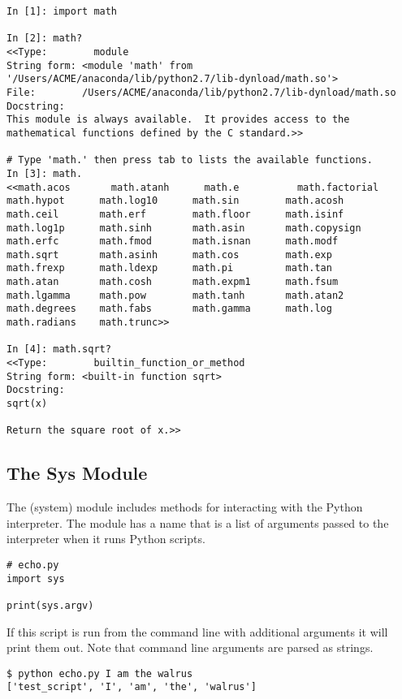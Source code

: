 \begin{lstlisting}
In [1]: import math

In [2]: math?
<<Type:        module
String form: <module 'math' from '/Users/ACME/anaconda/lib/python2.7/lib-dynload/math.so'>
File:        /Users/ACME/anaconda/lib/python2.7/lib-dynload/math.so
Docstring:
This module is always available.  It provides access to the
mathematical functions defined by the C standard.>>

# Type 'math.' then press tab to lists the available functions.
In [3]: math.
<<math.acos       math.atanh      math.e          math.factorial  
math.hypot      math.log10      math.sin        math.acosh      
math.ceil       math.erf        math.floor      math.isinf      
math.log1p      math.sinh       math.asin       math.copysign   
math.erfc       math.fmod       math.isnan      math.modf       
math.sqrt       math.asinh      math.cos        math.exp        
math.frexp      math.ldexp      math.pi         math.tan        
math.atan       math.cosh       math.expm1      math.fsum       
math.lgamma     math.pow        math.tanh       math.atan2      
math.degrees    math.fabs       math.gamma      math.log        
math.radians    math.trunc>>

In [4]: math.sqrt?
<<Type:        builtin_function_or_method
String form: <built-in function sqrt>
Docstring:
sqrt(x)

Return the square root of x.>>
\end{lstlisting}

\subsection*{The Sys Module}

The  (system) module includes methods for interacting with the Python interpreter.
The module has a name  that is a list of arguments passed to the interpreter when it runs Python scripts.

\begin{lstlisting}
# echo.py
import sys

print(sys.argv)
\end{lstlisting}

If this script is run from the command line with additional arguments it will print them out.
Note that command line arguments are parsed as strings.

\begin{lstlisting}
$ python echo.py I am the walrus
['test_script', 'I', 'am', 'the', 'walrus']
\end{lstlisting}

